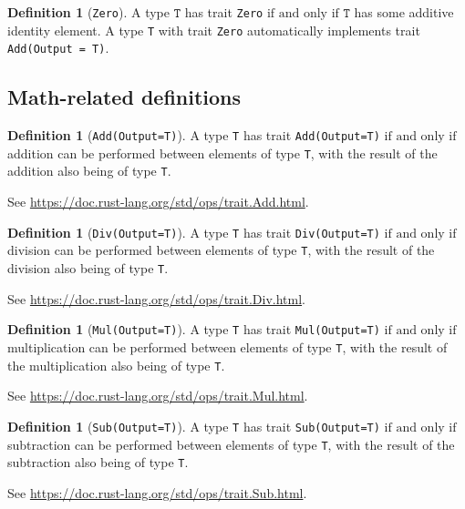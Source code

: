 \documentclass[11pt,a4paper]{article}
\theoremstyle{definition}
\newtheorem{definition}[theorem]{Definition}
\newcommand{\inRust}[2]{See \url{#2}.}
\newcommand{\T}{\texttt{T}}
\newcommand{\iffText}{\text{if and only if}}
\begin{document}
\begin{definition}[\texttt{Zero}]
A type $\T$ has trait \texttt{Zero} $\iffText$ $\T$ has some additive identity element. A type \texttt{T} with trait \texttt{Zero} automatically implements trait \texttt{Add(Output = T)}.
\end{definition}

\subsection{Math-related definitions}
\begin{definition}[\texttt{Add(Output=T)}]
    A type \texttt{T} has trait \texttt{Add(Output=T)} $\iffText$ addition can be performed between elements of type \texttt{T}, with the result of the addition also being of type \texttt{T}.
    
    \inRust{Trait std::ops::Add}{https://doc.rust-lang.org/std/ops/trait.Add.html}

\end{definition}

\begin{definition}[\texttt{Div(Output=T)}]
    A type \texttt{T} has trait \texttt{Div(Output=T)} $\iffText$ division can be performed between elements of type \texttt{T}, with the result of the division also being of type \texttt{T}.
    
    \inRust{Trait std::ops::Div}{https://doc.rust-lang.org/std/ops/trait.Div.html}
\end{definition}

\begin{definition}[\texttt{Mul(Output=T)}]
    A type \texttt{T} has trait \texttt{Mul(Output=T)} $\iffText$ multiplication can be performed between elements of type \texttt{T}, with the result of the multiplication also being of type \texttt{T}.
    
    \inRust{Trait std::ops::Mul}{https://doc.rust-lang.org/std/ops/trait.Mul.html}
\end{definition}

\begin{definition}[\texttt{Sub(Output=T)}]
\label{defn:trait-sub}
    A type \texttt{T} has trait \texttt{Sub(Output=T)} $\iffText$ subtraction can be performed between elements of type \texttt{T}, with the result of the subtraction also being of type \texttt{T}.
    
    \inRust{Trait std::ops::Sub}{https://doc.rust-lang.org/std/ops/trait.Sub.html}
\end{definition}
\end{document}
